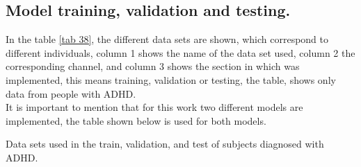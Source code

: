 \documentclass[letterpaper,12pt,openright,oneside]{article}
\begin{document}


   




\subsection{Model training, validation and testing.}
In the table \ref{tab 38}, the different data sets are shown, which correspond to different individuals, column 1 shows the name of the data set used, column 2 the corresponding channel, and column 3 shows the section in which was implemented, this means training, validation or testing, the table, shows only data from people with ADHD.\\

It is important to mention that for this work two different models are implemented, the table shown below is used for both models.\\


\begin{table}[H]
\centerline{}
\caption{Data sets used in the train, validation, and test of subjects diagnosed with ADHD.}
\label{tab 38}
\end{table}


\end{document}
